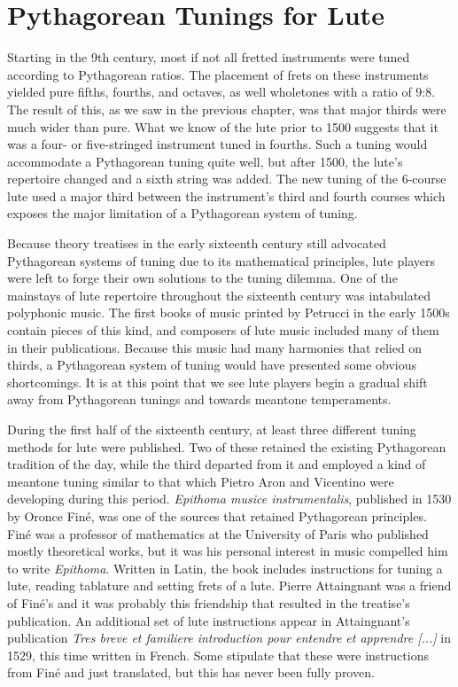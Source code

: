 \section{Pythagorean Tunings for Lute}

Starting in the 9th century, most if not all fretted instruments were tuned according to Pythagorean
ratios.  The placement of frets on these instruments yielded pure fifths,  fourths, and octaves, as
well  wholetones with a ratio of 9:8. \autocite[9]{ML:1}  The result of this, as we saw in the
previous chapter, was that major thirds were much wider than pure.  What we know of the lute prior
to 1500 suggests that it was a four- or five-stringed instrument tuned in fourths.  Such a tuning
would accommodate a Pythagorean tuning quite well, but after 1500, the lute's repertoire changed and
a sixth string was added.  The new tuning of the 6-course lute used a major third between the
instrument's third and fourth courses which exposes the major limitation of a Pythagorean system of
tuning.

Because theory treatises in the early sixteenth century still advocated Pythagorean systems of
tuning due to its mathematical principles, lute players were left to forge their own solutions
to the tuning dilemma.  One of the mainstays of lute repertoire throughout the sixteenth century was
intabulated polyphonic music. The first books of music printed by Petrucci in the early 1500s
contain pieces of this kind, and composers of lute music included many of them in their
publications. Because this music had many harmonies that relied on thirds, a Pythagorean system of
tuning would have presented some obvious shortcomings. It is at this point that we see lute players
begin a gradual shift away from Pythagorean tunings and towards meantone temperaments.

During the first half of the sixteenth century, at least three different tuning methods
for lute were published.  Two of these retained the existing Pythagorean tradition of
the day, while the third departed from it and employed a kind of meantone
tuning similar to that which Pietro Aron and Vicentino were developing during this period. 
\textit{Epithoma musice instrumentalis}, published in 1530 by Oronce
Fin\'{e}, was one of the sources that retained Pythagorean principles.  Fin\'{e} was a
professor of mathematics at the University of Paris who published mostly theoretical
works, but it was his personal interest in music compelled him to
write \textit{Epithoma}. Written in Latin, the book includes instructions for tuning a
lute, reading tablature and setting frets of a lute.  Pierre Attaingnant was a friend
of Fin\'{e}'s and it was probably this friendship that resulted in the treatise's
publication.  An additional set of lute instructions appear in Attaingnant's publication
\textit{Tres breve et familiere introduction pour entendre et apprendre [...]} in 1529,
this time written in French.  Some stipulate that these were instructions from Fin\'{e}
and just translated, but this has never been fully proven.\autocite[1]{PV:1}

